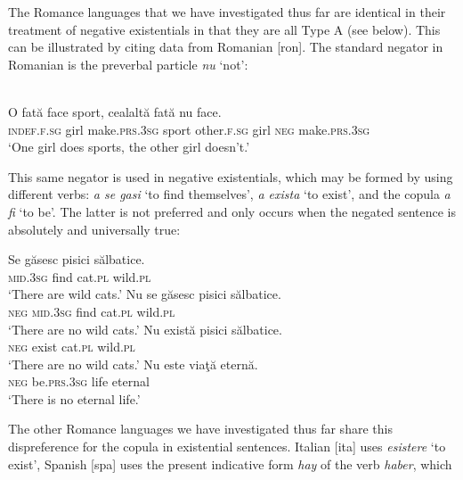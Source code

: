 ﻿\documentclass[output=paper]{langsci/langscibook}
\begin{document}
The Romance languages that we have investigated thus far are identical in
their treatment of negative existentials in that they are all Type A (see
 below). This can be illustrated by citing
data from Romanian [ron]. The standard negator in Romanian is the preverbal particle \textit{nu} `not':
%
\begin{exe}\ex
{}\\
    \gll O fată  face sport, cealaltă fată nu face.  \\
\textsc{indef.f.sg}   girl  make.\textsc{prs.3sg} sport other.\textsc{f.sg}
girl \textsc{neg}  make.\textsc{prs.3sg} \\
    \glt `One girl does sports, the other girl doesn't.'
    \end{exe}
%
This same negator is used in negative existentials, which may be formed by
using different verbs: \textit{a se gasi} `to find
themselves', \textit{a exista} `to exist', and the copula
\textit{a fi} `to be'. The latter is not preferred and only occurs
when the negated sentence is absolutely and universally true:
%
\begin{exe}\ex
{}
\begin{xlist}
\ex
    \gll Se găsesc  pisici  sălbatice.   \\
\textsc{mid.3sg}  find       cat.\textsc{pl}  wild.\textsc{pl} \\
    \glt `There are wild cats.'
\ex
    \gll Nu se găsesc  pisici  sălbatice. \\
    \textsc{neg} \textsc{mid.3sg} find cat.\textsc{pl} wild.\textsc{pl}\\
    \glt `There are no wild cats.'
\ex
    \gll Nu      există   pisici  sălbatice. \\
    \textsc{neg}  exist      cat.\textsc{pl}  wild.\textsc{pl}\\
    \glt `There are no wild cats.'
\ex
    \gll Nu   este viaţă eternă.\\
    \textsc{neg}  be.\textsc{prs.3sg}  life    eternal\\
\glt `There is no eternal life.'
    \end{xlist}\end{exe}
%
The other Romance languages we have investigated thus far share this
dispreference for the copula in existential sentences. Italian
[ita] uses \textit{esistere} `to exist', Spanish [spa] uses the
present indicative form \textit{hay} of the verb \textit{haber}, which
\end{document}
